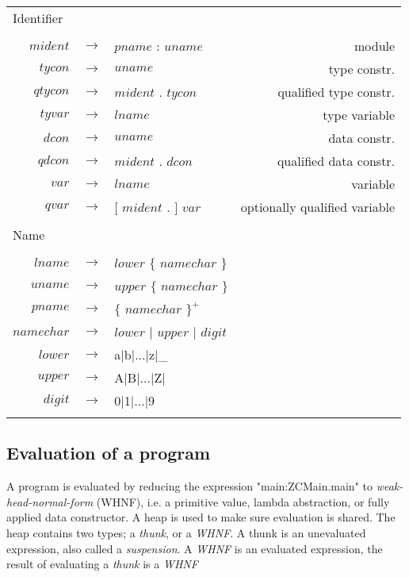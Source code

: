 \begin{scriptsize}
\begin{longtable}{ r c l r }
\multicolumn{4}{l}{Identifier}			 \\
\\[0.01in]
$mident$	& $ \rightarrow $	& $pname$ : $uname$									& module		\\
$tycon$		& $ \rightarrow $	& $uname$										& type constr.		\\
$qtycon$	& $ \rightarrow $	& $mident$ . $tycon$									& qualified type constr.\\
$tyvar$		& $ \rightarrow $	& $lname$										& type variable		\\
$dcon$		& $ \rightarrow $	& $uname$										& data constr.		\\
$qdcon$		& $ \rightarrow $	& $mident$ . $dcon$									& qualified data constr.\\
$var$		& $ \rightarrow $	& $lname$										& variable		\\
$qvar$		& $ \rightarrow $	& $[$ $mident$ . $]$ $var$								& optionally qualified variable\\
\\[0.01in]

\multicolumn{4}{l}{Name}			 \\
\\[0.01in]
$lname$		& $ \rightarrow $	& $lower$ $\{$ $namechar$ $\}$								& \\
$uname$		& $ \rightarrow $	& $upper$ $\{$ $namechar$ $\}$								& \\
$pname$		& $ \rightarrow $	& $\{$ $namechar$ $\}^{+}$								& \\
$namechar$	& $ \rightarrow $	& $lower$ $|$ $upper$ $|$ $digit$							& \\
$lower$		& $ \rightarrow $	& a$|$b$|$...$|$z$|$\_									& \\
$upper$		& $ \rightarrow $	& A$|$B$|$...$|$Z$|$									& \\
$digit$		& $ \rightarrow $	& 0$|$1$|$...$|$9									& \\
\\[0.01in]

\end{longtable}
\end{scriptsize}

\clearpage

\subsection{Evaluation of a program}

A program is evaluated by reducing the expression "main:ZCMain.main" to \emph{weak-head-normal-form} (WHNF),
i.e. a primitive value, lambda abstraction, or fully applied data constructor. A heap is used to make
sure evaluation is shared. The heap contains two types; a \emph{thunk}, or a \emph{WHNF}. A thunk is an unevaluated
expression, also called a \emph{suspension}. A \emph{WHNF} is an evaluated expression, the result of evaluating a \emph{thunk}
is a \emph{WHNF} \cite{tolmach2010ghc}



